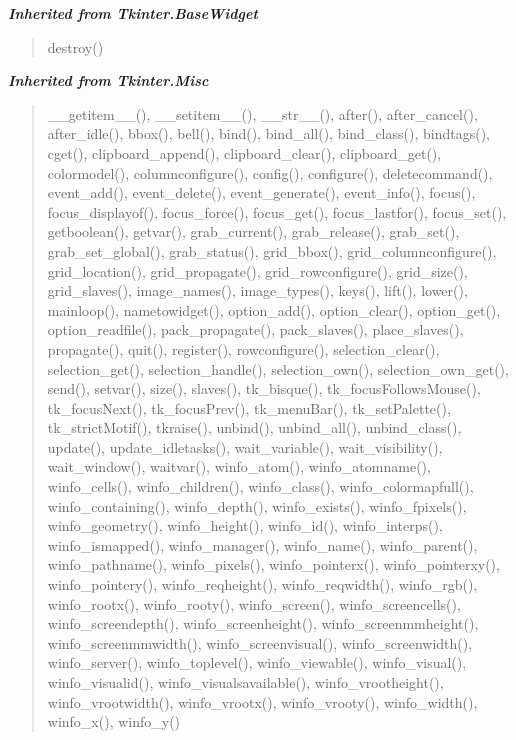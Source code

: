 \large{\textbf{\textit{Inherited from Tkinter.BaseWidget}}}

\begin{quote}
destroy()
\end{quote}

\large{\textbf{\textit{Inherited from Tkinter.Misc}}}

\begin{quote}
\_\_getitem\_\_(), \_\_setitem\_\_(), \_\_str\_\_(), after(), after\_cancel(), after\_idle(), bbox(), bell(), bind(), bind\_all(), bind\_class(), bindtags(), cget(), clipboard\_append(), clipboard\_clear(), clipboard\_get(), colormodel(), columnconfigure(), config(), configure(), deletecommand(), event\_add(), event\_delete(), event\_generate(), event\_info(), focus(), focus\_displayof(), focus\_force(), focus\_get(), focus\_lastfor(), focus\_set(), getboolean(), getvar(), grab\_current(), grab\_release(), grab\_set(), grab\_set\_global(), grab\_status(), grid\_bbox(), grid\_columnconfigure(), grid\_location(), grid\_propagate(), grid\_rowconfigure(), grid\_size(), grid\_slaves(), image\_names(), image\_types(), keys(), lift(), lower(), mainloop(), nametowidget(), option\_add(), option\_clear(), option\_get(), option\_readfile(), pack\_propagate(), pack\_slaves(), place\_slaves(), propagate(), quit(), register(), rowconfigure(), selection\_clear(), selection\_get(), selection\_handle(), selection\_own(), selection\_own\_get(), send(), setvar(), size(), slaves(), tk\_bisque(), tk\_focusFollowsMouse(), tk\_focusNext(), tk\_focusPrev(), tk\_menuBar(), tk\_setPalette(), tk\_strictMotif(), tkraise(), unbind(), unbind\_all(), unbind\_class(), update(), update\_idletasks(), wait\_variable(), wait\_visibility(), wait\_window(), waitvar(), winfo\_atom(), winfo\_atomname(), winfo\_cells(), winfo\_children(), winfo\_class(), winfo\_colormapfull(), winfo\_containing(), winfo\_depth(), winfo\_exists(), winfo\_fpixels(), winfo\_geometry(), winfo\_height(), winfo\_id(), winfo\_interps(), winfo\_ismapped(), winfo\_manager(), winfo\_name(), winfo\_parent(), winfo\_pathname(), winfo\_pixels(), winfo\_pointerx(), winfo\_pointerxy(), winfo\_pointery(), winfo\_reqheight(), winfo\_reqwidth(), winfo\_rgb(), winfo\_rootx(), winfo\_rooty(), winfo\_screen(), winfo\_screencells(), winfo\_screendepth(), winfo\_screenheight(), winfo\_screenmmheight(), winfo\_screenmmwidth(), winfo\_screenvisual(), winfo\_screenwidth(), winfo\_server(), winfo\_toplevel(), winfo\_viewable(), winfo\_visual(), winfo\_visualid(), winfo\_visualsavailable(), winfo\_vrootheight(), winfo\_vrootwidth(), winfo\_vrootx(), winfo\_vrooty(), winfo\_width(), winfo\_x(), winfo\_y()
\end{quote}

